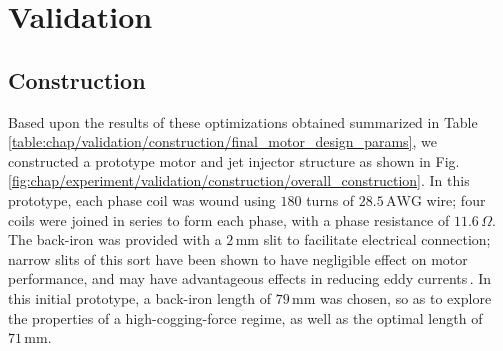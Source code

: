 \section{Validation}                                \label{Chapter:experiment/validation}


        \subsection{Construction}                   \label{Chapter:construction}
        
        
            Based upon the results of these optimizations obtained summarized in Table\,\ref{table:chap/validation/construction/final_motor_design_params}, we constructed a prototype motor and jet injector structure as shown in Fig.\,\ref{fig:chap/experiment/validation/construction/overall_construction}. In this prototype, each phase coil was wound using $180$ turns of $28.5\,\mathrm{AWG}$ wire; four coils were joined in series to form each phase, with a phase resistance of $11.6\,\Omega$. The back-iron was provided with a $2\,\mathrm{mm}$ slit to facilitate electrical connection; narrow slits of this sort have been shown to have negligible effect on motor performance, and may have advantageous effects in reducing eddy currents\,\cite{Meessen2009AnalysisApplications}. In this initial prototype, a back-iron length of $79\,\mathrm{mm}$ was chosen, so as to explore the properties of a high-cogging-force regime, as well as the optimal length of $71\,\mathrm{mm}$.
        
